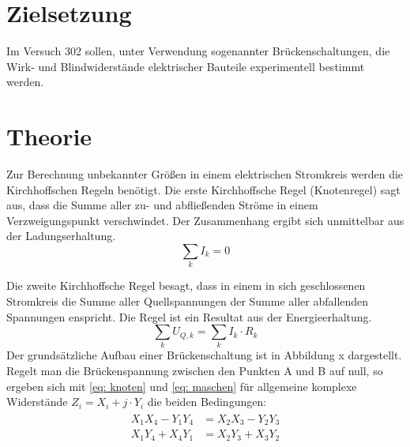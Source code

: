 \section*{Zielsetzung}
Im Versuch 302 sollen, unter Verwendung sogenannter Brückenschaltungen, die Wirk- und Blindwiderstände
 elektrischer Bauteile experimentell bestimmt werden.
\section{Theorie}
Zur Berechnung unbekannter Größen in einem elektrischen Stromkreis werden die Kirchhoffschen Regeln
benötigt. Die erste Kirchhoffsche Regel (Knotenregel) sagt aus, dass die Summe aller zu- und abfließenden
Ströme in einem Verzweigungspunkt verschwindet. Der Zusammenhang ergibt sich unmittelbar aus der Ladungserhaltung.
\begin{equation}
  \sum_k I_k = 0
  \label{eq: knoten}
\end{equation}

Die zweite Kirchhoffsche Regel besagt, dass in einem in sich geschlossenen Stromkreis
die Summe aller Quellspannungen der Summe aller abfallenden
Spannungen enspricht. Die Regel ist ein Resultat aus der Energieerhaltung.
\begin{equation}
  \sum_k U_{Q,k} = \sum_k I_k \cdot R_k
  \label{eq: maschen}
\end{equation}
Der grundsätzliche Aufbau einer Brückenschaltung ist in Abbildung x dargestellt. Regelt man die Brückenspannung
zwischen den Punkten A und B auf null, so ergeben sich mit \eqref{eq: knoten} und \eqref{eq: maschen}
für allgemeine komplexe Widerstände $Z_i = X_i + j \cdot Y_i$ die
beiden Bedingungen:
\begin{align}
  \begin{aligned}
    X_1 X_4 - Y_1 Y_4 &= X_2 X_3 - Y_2 Y_3 \\
    X_1 Y_4 + X_4 Y_1 &= X_2 Y_3 + X_3 Y_2
  \end{aligned}
  \label{eq: widerstandsbedingungen}
\end{align}
